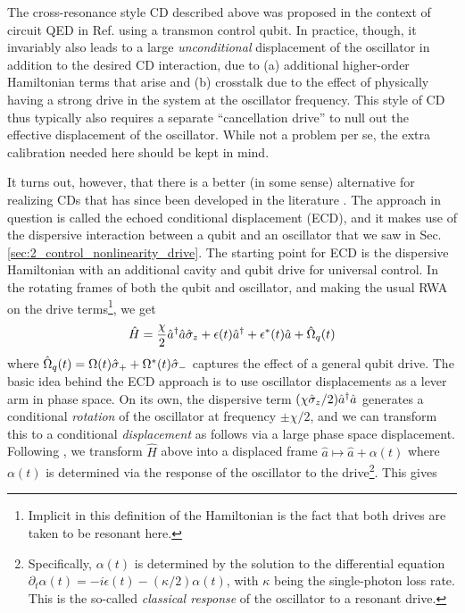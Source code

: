 The cross-resonance style CD described above was proposed in the context of circuit QED in Ref. \cite{touzard2019gated} using a transmon control qubit. In practice, though, it invariably also leads to a large \textit{unconditional} displacement of the oscillator in addition to the desired CD interaction, due to (a) additional higher-order Hamiltonian terms that arise and (b) crosstalk due to the effect of physically having a strong drive in the system at the oscillator frequency. This style of CD thus typically also requires a separate ``cancellation drive'' to null out the effective displacement of the oscillator. While not a problem per se, the extra calibration needed here should be kept in mind. 

It turns out, however, that there is a better (in some sense) alternative for realizing CDs that has since been developed in the literature \cite{campagne2020gkp-expt, eickbusch2022fast}. The approach in question is called the echoed conditional displacement (ECD), and it makes use of the dispersive interaction between a qubit and an oscillator that we saw in Sec. \ref{sec:2_control_nonlinearity_drive}. The starting point for ECD is the dispersive Hamiltonian with an additional cavity and qubit drive for universal control. In the rotating frames of both the qubit and oscillator, and making the usual RWA on the drive terms\footnote{Implicit in this definition of the Hamiltonian is the fact that both drives are taken to be resonant here.}, we get 
\begin{equation}
    \hat{H} = \frac{\chi}{2}\hat{a}^\dagger\hat{a}\hat{\sigma}_z + \epsilon(t)\hat{a}^\dagger + \epsilon^\ast(t)\hat{a} + \hat{\Omega}_q(t)
\end{equation}
where $\hat{\Omega}_q(t) = \Omega(t)\hat{\sigma}_+ + \Omega^\ast(t)\hat{\sigma}_-$ captures the effect of a general qubit drive. The basic idea behind the ECD approach is to use oscillator displacements as a lever arm in phase space. On its own, the dispersive term $(\chi\hat{\sigma}_z/2)\hat{a}^\dagger\hat{a}$ generates a conditional \textit{rotation} of the oscillator at frequency $\pm \chi/2$, and we can transform this to a conditional \textit{displacement} as follows via a large phase space displacement. Following \cite{eickbusch2022fast}, we transform $\hat{H}$ above into a displaced frame $\hat{a} \mapsto \hat{a} + \alpha(t)$ where $\alpha(t)$ is determined via the response of the oscillator to the drive\footnote{Specifically, $\alpha(t)$ is determined by the solution to the differential equation $\partial_t\alpha(t) = -i\epsilon(t) - (\kappa/2)\alpha(t)$, with $\kappa$ being the single-photon loss rate. This is the so-called \textit{classical response} of the oscillator to a resonant drive.}. This gives
